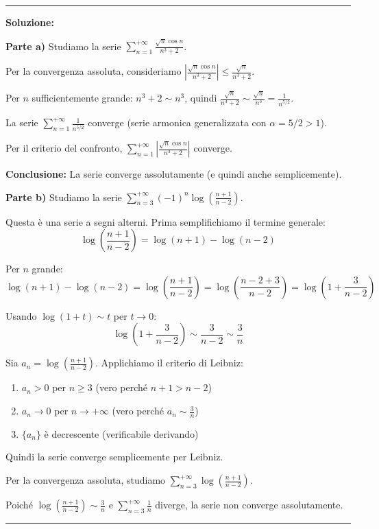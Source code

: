 \documentclass[12pt, a4paper]{article}
\newenvironment{solution}
{\par\noindent\rule{\textwidth}{0.4pt}\par\textbf{Soluzione:}\medskip\par}
{\par\rule{\textwidth}{0.4pt}\par\bigskip}
\begin{document}
\begin{solution}
\textbf{Parte a)} Studiamo la serie $\displaystyle\sum_{n=1}^{+\infty} \frac{\sqrt{n}\cos n}{n^{3}+2}$.

Per la convergenza assoluta, consideriamo $\left|\frac{\sqrt{n}\cos n}{n^{3}+2}\right| \leq \frac{\sqrt{n}}{n^{3}+2}$.

Per $n$ sufficientemente grande: $n^3 + 2 \sim n^3$, quindi $\frac{\sqrt{n}}{n^{3}+2} \sim \frac{\sqrt{n}}{n^3} = \frac{1}{n^{5/2}}$.

La serie $\displaystyle\sum_{n=1}^{+\infty} \frac{1}{n^{5/2}}$ converge (serie armonica generalizzata con $\alpha = 5/2 > 1$).

Per il criterio del confronto, $\displaystyle\sum_{n=1}^{+\infty} \left|\frac{\sqrt{n}\cos n}{n^{3}+2}\right|$ converge.

\textbf{Conclusione:} La serie converge assolutamente (e quindi anche semplicemente).

\vspace{0.5cm}

\textbf{Parte b)} Studiamo la serie $\displaystyle\sum_{n=3}^{+\infty} (-1)^{n} \log\left(\frac{n+1}{n-2}\right)$.

Questa è una serie a segni alterni. Prima semplifichiamo il termine generale:
\[
\log\left(\frac{n+1}{n-2}\right) = \log(n+1) - \log(n-2)
\]

Per $n$ grande: 
\[
\log(n+1) - \log(n-2) = \log\left(\frac{n+1}{n-2}\right) = \log\left(\frac{n-2+3}{n-2}\right) = \log\left(1 + \frac{3}{n-2}\right)
\]

Usando $\log(1+t) \sim t$ per $t \to 0$:
\[
\log\left(1 + \frac{3}{n-2}\right) \sim \frac{3}{n-2} \sim \frac{3}{n}
\]

Sia $a_n = \log\left(\frac{n+1}{n-2}\right)$. Applichiamo il criterio di Leibniz:
\begin{enumerate}
    \item $a_n > 0$ per $n \geq 3$ (vero perché $n+1 > n-2$)
    \item $a_n \to 0$ per $n \to +\infty$ (vero perché $a_n \sim \frac{3}{n}$)
    \item $\{a_n\}$ è decrescente (verificabile derivando)
\end{enumerate}

Quindi la serie converge semplicemente per Leibniz.

Per la convergenza assoluta, studiamo $\displaystyle\sum_{n=3}^{+\infty} \log\left(\frac{n+1}{n-2}\right)$.

Poiché $\log\left(\frac{n+1}{n-2}\right) \sim \frac{3}{n}$ e $\displaystyle\sum_{n=3}^{+\infty} \frac{1}{n}$ diverge, la serie non converge assolutamente.


\end{solution}
\end{document}

